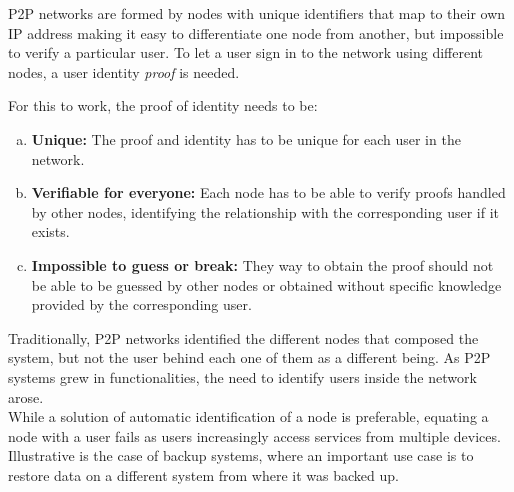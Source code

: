 P2P networks are formed by nodes with unique identifiers that map to their
own IP address making it easy to differentiate one node from another, but
impossible to verify a particular user.
 To let a user sign in to the
network using different nodes, a user identity \textit{proof} is needed.


For this to work, the proof of identity needs to be:
\begin{enumerate}[a)]
  \item \textbf{Unique:} The proof and identity has to be unique for each user in the network.

  \item \textbf{Verifiable for everyone:}  Each node has to be able to verify proofs
    handled by other nodes, identifying the relationship with the corresponding user if it
    exists.
  \item \textbf{Impossible to guess or break:} They way to obtain the proof should not
    be able to be guessed by other nodes or obtained without specific knowledge
    provided by the corresponding user.
\end{enumerate}

Traditionally, P2P networks identified the different nodes that composed the
system, but not the user behind each one of them as a different being.
As P2P systems grew in functionalities, the need to identify users inside the
network arose.\\

While a solution of automatic identification of a node is preferable, equating a node with a user fails as users
increasingly access services from multiple devices.
Illustrative is the case of backup systems, where an important use case is to
restore data on a different system from where it was backed up. \\

